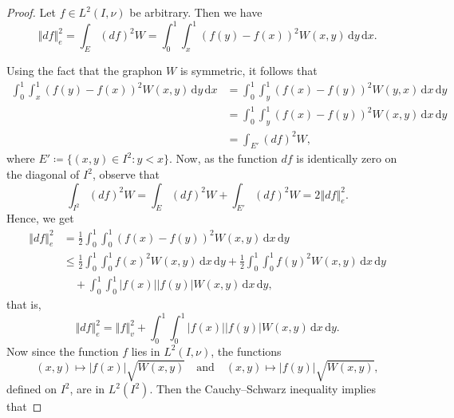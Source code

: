 \documentclass[12pt,a4paper,bold]{thesis}
\theoremstyle{definition}
\newcommand*{\abs}[1]{\left\vert #1 \right\vert}
\newcommand*{\norm}[2][]{\left\Vert #2 \right\Vert_{#1}}
\begin{document}
\begin{proof}
    Let $f \in L^2(I, \nu)$ be arbitrary. Then we have
    \begin{equation*}
        \norm[e]{df}^2 = \int_{E} (df)^2 W
        = \int_{0}^{1} \int_{x}^{1} (f(y) - f(x))^2 W(x,y)\, \mathrm{d}y\, \mathrm{d}x.
    \end{equation*}

    Using the fact that the graphon $W$ is symmetric, it follows that
    \begin{align*}
        \int_{0}^{1} \int_{x}^{1} (f(y) - f(x))^2 W(x,y)\, \mathrm{d}y\, \mathrm{d}x
        & = 
        \int_{0}^{1} \int_{y}^{1} (f(x) - f(y))^2 W(y,x)\, \mathrm{d}x\, \mathrm{d}y
        \\
        & =
        \int_{0}^{1} \int_{y}^{1} (f(x) - f(y))^2 W(x,y)\, \mathrm{d}x\, \mathrm{d}y
        \\
        & = 
        \int_{E'} (df)^2 W,
    \end{align*}
    where $E' \coloneq \{(x,y) \in I^2 : y < x\}$. Now, as the function $df$ is 
    identically zero on the diagonal of $I^2$, observe that
    \begin{equation*}
        \int_{I^2} (df)^2 W = \int_{E} (df)^2 W + \int_{E'} (df)^2 W = 2 \norm[e]{df}^2.
    \end{equation*}
    Hence, we get
    \begin{align*}
        \norm[e]{df}^2 
        & = 
        \frac{1}{2} \int_0^1 \int_0^1 (f(x) - f(y))^2 W(x,y)\, \mathrm{d}x\, \mathrm{d}y
        \\
        & \leq
        \frac{1}{2} \int_0^1 \int_0^1 f(x)^2 W(x,y)\, \mathrm{d}x\, \mathrm{d}y 
        + \frac{1}{2} \int_0^1 \int_0^1 f(y)^2 W(x,y)\, \mathrm{d}x\, \mathrm{d}y
        \\
        & \quad +
        \int_0^1 \int_0^1 \abs{f(x)} \abs{f(y)} W(x,y)\, \mathrm{d}x\, \mathrm{d}y,
    \end{align*}
    that is,
    \begin{equation*}
        \norm[e]{df}^2 = \norm[v]{f}^2 
        + \int_0^1 \int_0^1 \abs{f(x)} \abs{f(y)} W(x,y)\, \mathrm{d}x\, \mathrm{d}y.
    \end{equation*}
    Now since the function $f$ lies in $L^2(I, \nu)$, the functions 
    \begin{equation*}
        (x,y) \mapsto |f(x)| \sqrt{W(x,y)} \quad \text{and} \quad 
        (x,y) \mapsto |f(y)| \sqrt{W(x,y)},
    \end{equation*}
    defined on $I^2$, are in $L^2(I^2)$. Then the Cauchy--Schwarz inequality implies that

\end{proof}
\end{document}
